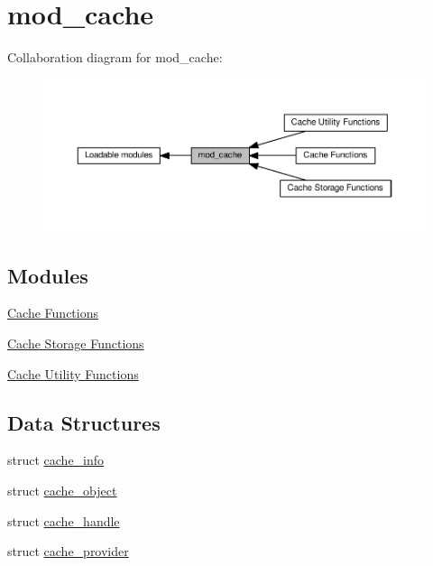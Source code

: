 \hypertarget{group__MOD__CACHE}{}\section{mod\+\_\+cache}
\label{group__MOD__CACHE}
Collaboration diagram for mod\+\_\+cache\+:
\nopagebreak
\begin{figure}[H]
\begin{center}
\leavevmode
\includegraphics[width=350pt]{group__MOD__CACHE}
\end{center}
\end{figure}
\subsection*{Modules}
\begin{DoxyCompactItemize}
\item 
\hyperlink{group__Cache__cache}{Cache Functions}
\item 
\hyperlink{group__Cache__storage}{Cache Storage Functions}
\item 
\hyperlink{group__Cache__util}{Cache Utility Functions}
\end{DoxyCompactItemize}
\subsection*{Data Structures}
\begin{DoxyCompactItemize}
\item 
struct \hyperlink{structcache__info}{cache\+\_\+info}
\item 
struct \hyperlink{structcache__object}{cache\+\_\+object}
\item 
struct \hyperlink{structcache__handle}{cache\+\_\+handle}
\item 
struct \hyperlink{structcache__provider}{cache\+\_\+provider}
\end{DoxyCompactItemize}
